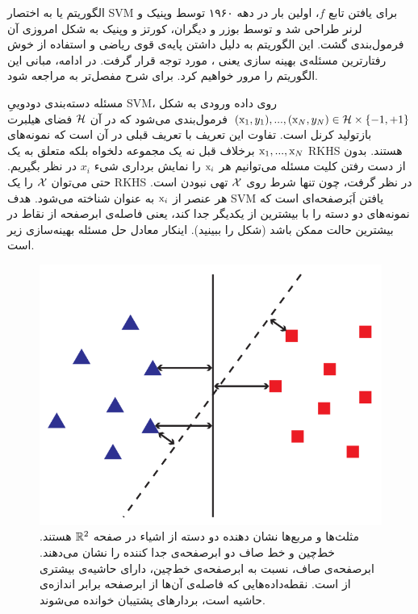 الگوریتم  یا به اختصار SVM برای یافتن تابع $f$، اولین بار در دهه ۱۹۶۰ توسط وپنیک و لرنر طراحی شد و توسط بوزر و دیگران، کورتز و وپنیک به شکل امروزی آن فرمول‌بندی گشت. این الگوریتم به دلیل داشتن پایه‌ی قوی ریاضی و استفاده از خوش رفتارترین مسئله‌ی بهینه سازی‌ یعنی ، مورد توجه قرار گرفت. در ادامه، مبانی این الگوریتم را مرور خواهیم کرد. برای شرح مفصل‌تر به  مراجعه شود.

مسئله دسته‌بندی دودوییِ SVM، روی داده ورودی به شکل 
$(\mathrm{x}_1,y_1),...,(\mathrm{x}_N,y_N) \in \mathcal{H}\times\left\lbrace -1,+1 \right\rbrace$
 فرمول‌بندی می‌شود که در آن $\mathcal{H}$ فضای هیلبرت بازتولید کرنل است. تفاوت این تعریف با تعریف قبلی در آن است که نمونه‌های $\mathrm{x}_1,...,\mathrm{x}_N$ برخلاف قبل نه یک مجموعه دلخواه بلکه متعلق به یک RKHS هستند. بدون از دست رفتن کلیت مسئله می‌توانیم هر $\mathrm{x}_i$ را نمایش برداری شیء $x_i$ در نظر بگیریم. حتی می‌توان $\mathcal{X}$ را یک RKHS در نظر گرفت، چون تنها شرط روی $\mathcal{X}$ تهی نبودن است. هر عنصر از $\mathrm{x}_i$ به عنوان  شناخته می‌شود. هدف SVM یافتن اَبَرصفحه‌ای است که نمونه‌های دو دسته را با بیشترین  از یکدیگر جدا کند، یعنی فاصله‌ی ابرصفحه از نقاط در بیشترین حالت ممکن باشد (شکل  را ببینید). اینکار معادل حل مسئله بهینه‌سازی زیر است.
 
\begin{figure}[ht]
\centering
\includegraphics[scale=0.3]{./svm-margin.png}
\caption{مثلث‌ها و مربع‌ها نشان دهنده دو دسته از اشیاء در صفحه $\mathbb{R}^2$ هستند. خط‌چین و خط صاف دو ابرصفحه‌ی جدا کننده را نشان می‌دهند. ابرصفحه‌ی ‌صاف، نسبت به ابرصفحه‌ی ‌خط‌چین، دارای حاشیه‌ی ‌بیشتری از  است. نقطه‌داده‌هایی که فاصله‌ی آن‌ها از ابرصفحه برابر انداز‌ه‌ی حاشیه است، بردارهای پشتیبان خوانده می‌شوند.}
\label{fig:svm-margin}
\end{figure} 
 
